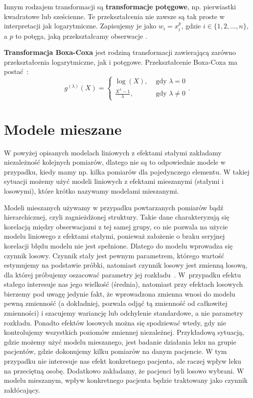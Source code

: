 \documentclass[12pt]{mwbk}
\theoremstyle{plain}
\theoremstyle{definition}
\theoremstyle{definition}
\begin{document}
Innym rodzajem transformacji są \textbf{transformacje potęgowe}, np. pierwiastki kwadratowe lub sześcienne. Te przekształcenia nie zawsze są tak proste w interpretacji jak logarytmiczne. Zapisujemy je jako $w_i=x_i^p$, gdzie $i \in \lbrace{1,2,\ldots,n\rbrace}$, a $p$ to potęga, jaką przekształcamy obserwacje \cite{forecasting}.

\textbf{Transformacja Boxa-Coxa} jest rodziną transformacji zawierającą zarówno przekształcenia logarytmiczne, jak i potęgowe. Przekształcenie Boxa-Coxa ma postać~\cite{boxcox}:
$$g^{(\lambda)}(X)=\begin{cases}
\log(X), & \text{ gdy } \lambda=0 \\
\frac{X^{\lambda}-1}{\lambda},&\text{ gdy } \lambda \neq 0
\end{cases}. $$

\section{Modele mieszane} 
W powyżej opisanych modelach liniowych z efektami stałymi zakładamy niezależność kolejnych pomiarów, dlatego nie są to odpowiednie modele w przypadku, kiedy mamy np. kilka pomiarów dla pojedynczego elementu. W takiej sytuacji możemy użyć modeli liniowych z efektami mieszanymi (stałymi i losowymi), które krótko nazywamy modelami mieszanymi.

Modeli mieszanych używamy w przypadku powtarzanych pomiarów bądź hierarchicznej, czyli zagnieżdżonej struktury. Takie dane charakteryzują się korelacją między obserwacjami z tej samej grupy, co nie pozwala na użycie modelu liniowego z efektami stałymi, ponieważ założenie o braku seryjnej korelacji błędu modelu nie jest spełnione. Dlatego do modelu wprowadza się czynnik losowy.  Czynnik stały jest pewnym parametrem, którego wartość estymujemy na podstawie próbki, natomiast czynnik losowy jest zmienną losową, dla której próbujemy oszacować parametry jej rozkładu~\cite{faraway}. W~przypadku efektu stałego interesuje nas jego wielkość (średnia), natomiast przy efektach losowych bierzemy pod uwagę jedynie fakt, że wprowadzona zmienna wnosi do modelu pewną zmienność (a dokładniej, pozwala odjąć tą zmienność od całkowitej zmienności) i szacujemy wariancję lub odchylenie standardowe, a nie parametry rozkładu. Ponadto efektów losowych można się spodziewać wtedy, gdy nie kontrolujemy wszystkich poziomów zmiennej niezależnej. Przykładową sytuacją, gdzie możemy użyć modelu mieszanego, jest badanie działania leku na grupie pacjentów, gdzie dokonujemy kilku pomiarów na danym pacjencie. W tym przypadku nie interesuje nas efekt konkretnego pacjenta, ale raczej wpływ leku na przeciętną osobę. Dodatkowo zakładamy, że pacjenci byli losowo wybrani. W modelu mieszanym, wpływ konkretnego pacjenta będzie traktowany jako czynnik zakłócający.
\end{document}
